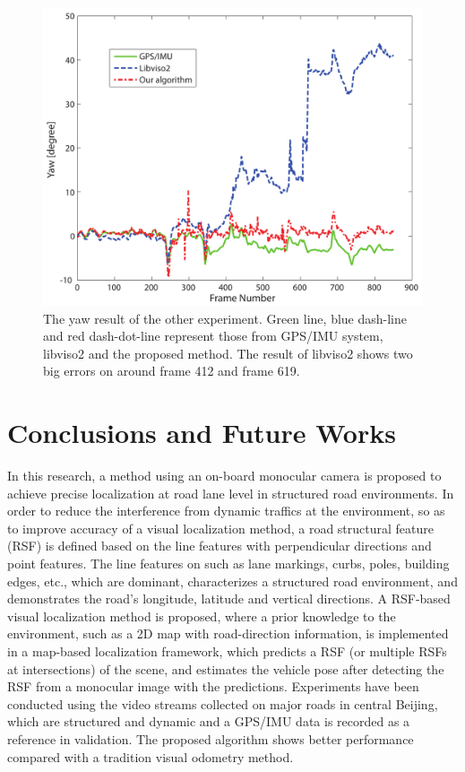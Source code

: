 \documentclass[letterpaper, 10 pt, conference]{ieeeconf}  %
\begin{document}
\begin{figure}[t]
\centering
\includegraphics[width=0.9\linewidth]{source//Final//R_result_Frame200_1049.pdf}
\caption{The yaw result of the other experiment. Green line, blue dash-line and red dash-dot-line represent those from GPS/IMU system, libviso2 and the proposed method. The result of libviso2 shows two big errors on around frame 412 and frame 619.}
\label{fig:another_rotation_result}
\end{figure}

\section{Conclusions and Future Works}
\label{sec_conclusion}

In this research, a method using an on-board monocular camera is proposed to achieve precise localization at road lane level in structured road environments. In order to reduce the interference from dynamic traffics at the environment, so as to improve accuracy of a visual localization method, a road structural feature (RSF) is defined based on the line features with perpendicular directions and point features. The line features on such as lane markings, curbs, poles, building edges, etc., which are dominant, characterizes a structured road environment, and demonstrates the road's longitude, latitude and vertical directions.
A RSF-based visual localization method is proposed, where a prior knowledge to the environment, such as a 2D map with road-direction information, is implemented in a map-based localization framework, which predicts a RSF (or multiple RSFs at intersections) of the scene, and  estimates the vehicle pose after detecting the RSF from a monocular image with the predictions.
Experiments have been conducted using the video streams collected on major roads in central Beijing, which are structured and dynamic and a GPS/IMU data is recorded as a reference in validation.
The proposed algorithm shows better performance compared with a tradition visual odometry method.
\end{document}
